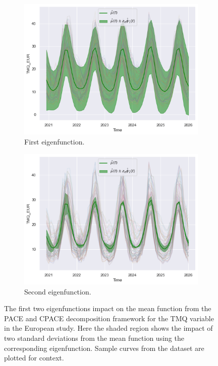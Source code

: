 \begin{figure}
	\centering
	\begin{subfigure}[b]{0.45\textwidth}
		\includegraphics[width=\textwidth]{phi_1_tmq_eur}
		\caption{First eigenfunction.}
		\label{fig:phi_1_tmq_eur}
	\end{subfigure}
	\hfill        
	\begin{subfigure}[b]{0.45\textwidth}
		\includegraphics[width=\textwidth]{phi_2_tmq_eur}
		\caption{Second eigenfunction.}
		\label{fig:phi_2_tmq_eur}
	\end{subfigure}
	\caption{The first two eigenfunctions impact on the mean function from the PACE and CPACE decomposition framework for the TMQ variable in the European study. Here the shaded region shows the impact of two standard deviations from the mean function using the corresponding eigenfunction. Sample curves from the dataset are plotted for context.}
	\label{fig:phi_tmq_eur}
\end{figure}


